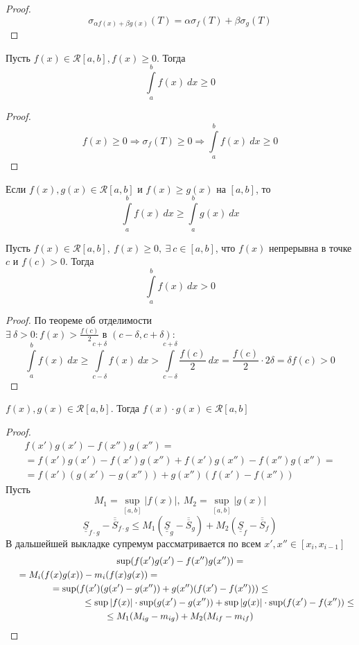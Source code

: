\begin{proof}
    \[\sigma_{\alpha f(x)+\beta g(x)}(T)=\alpha\sigma_f(T)+\beta\sigma_g(T)\]
\end{proof}
\begin{numtheorem}
    Пусть $f(x)\in \mathcal{R}[a,b], f(x)\geq 0$. Тогда
    \[\int\limits_{a}^{b}f(x)\ dx\geq 0\]
\end{numtheorem}
\begin{proof}
    \[f(x)\geq 0 \Rightarrow \sigma_f(T)\geq 0 \Rightarrow \int\limits_{a}^{b} f(x)\ dx \geq 0\]
\end{proof} 
\begin{consequense}
    Если $f(x), g(x)\in \mathcal{R}[a,b]$ и $f(x)\geq g(x)$ на $[a,b]$, то 
    \[\int\limits_{a}^{b}f(x)\ dx\geq \int\limits_{a}^{b}g(x)\ dx\]
\end{consequense}
\begin{numtheorem}
    Пусть $f(x)\in \mathcal{R}[a,b],\ f(x)\geq 0,\ \exists\ c\in[a,b]$, что $f(x)$ непрерывна в точке $c$ и $f(c)>0$. Тогда 
    \[\int\limits_{a}^{b}f(x)\ dx>0\]
\end{numtheorem}
\begin{proof}
    По теореме об отделимости\\
    $\exists\ \delta>0: f(x)>\frac{f(c)}{2}$ в $(c-\delta, c+\delta):$
    \[\int\limits_{a}^{b}f(x)\ dx\geq \int\limits_{c-\delta}^{c+\delta}f(x)\ dx>\int\limits_{c-\delta}^{c+\delta}\frac{f(c)}{2}\ dx=\frac{f(c)}{2}\cdot 2\delta=\delta f(c)>0\]
\end{proof}
\begin{numtheorem}
    $f(x), g(x)\in \mathcal{R}[a,b]$. Тогда $f(x)\cdot g(x)\in \mathcal{R}[a,b]$
\end{numtheorem}
\begin{proof}
    \begin{multline*}
        f(x')g(x')-f(x'')g(x'')=\\=f(x')g(x')-f(x')g(x'')+f(x')g(x'')-f(x'')g(x'')=\\
        =f(x')(g(x')-g(x''))+g(x'')(f(x')-f(x''))
    \end{multline*}
    Пусть 
    \[M_1=\sup\limits_{[a,b]}|f(x)|,\ M_2=\sup\limits_{[a,b]}|g(x)|\]
    \begin{equation*}
        \underline{\underline{S}}_{f\cdot g}-\overline{\overline{S}}_{f\cdot g}\leq M_1(\underline{\underline{S}}_g-\overline{\overline{S}}_g)+M_2(\underline{\underline{S}}_f-\overline{\overline{S}}_f)
    \end{equation*}
    В дальшейшей выкладке супремум рассматривается по всем $x',x''\in[x_i,x_{i-1}]$
    \begin{multline*}
        \sup(f(x')g(x')-f(x'')g(x''))=\\
        =M_i(f(x)g(x))-m_i(f(x)g(x))=\tab[7cm]\\
        =\sup(f(x')(g(x')-g(x''))+g(x'')(f(x')-f(x'')))\leq\tab[1.5cm]\\
        \tab[3cm]\leq \sup|f(x)|\cdot \sup(g(x')-g(x''))+\sup|g(x)|\cdot \sup(f(x')-f(x''))\leq \\
        \leq M_1 (M_{ig}-m_{ig})+M_2(M_{if}-m_{if})
    \end{multline*}
\end{proof}